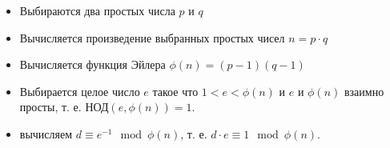 \begin{itemize}
\item Выбираются два простых числа $p$ и $q$
\item Вычисляется произведение выбранных простых чисел $n = p\cdot q$
\item Вычисляется функция Эйлера 
\(
\phi\left(n\right)=\left(p - 1 \right)\left(q - 1 \right)
\)
\item Выбирается целое число $e$ такое что 
\(
1 < e < \phi\left(n\right)
\) и $e$ и $\phi\left(n\right)$ взаимно просты,
т. е. 
\(
\mbox{НОД}\left( e, \phi\left(n\right) \right) = 1.
\)
\item вычисляем $d \equiv e^{-1} \mod{\phi\left(n\right)}$, т. е.
$d \cdot e \equiv 1 \mod{\phi\left(n\right)}$.
\end{itemize}
